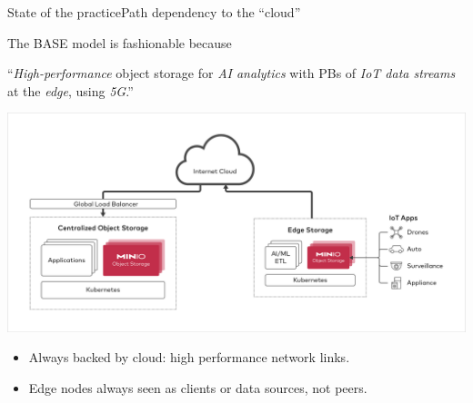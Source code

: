 \begin{frame}{State of the practice}{Path dependency to the ``cloud''}

\begin{block}{The BASE model is fashionable because}
\centering 

``\emph{High-performance} object storage for \emph{AI analytics} with PBs of \emph{IoT data streams} at the \emph{edge}, using \emph{5G}.''
\end{block}

\vfill\centering

\includegraphics[width=.9\columnwidth]{figures/minio_edge.png}

\vfill\raggedright


\begin{itemize}
	\item Always backed by cloud: high performance network links.
	\item Edge nodes always seen as clients or data sources, not peers.
\end{itemize}





\end{frame}





